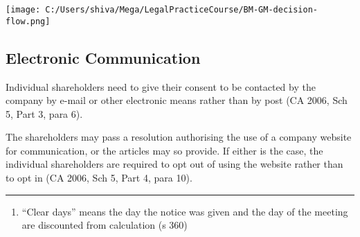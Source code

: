 \documentclass[
]{article}
\providecommand{\tightlist}{%
  \setlength{\itemsep}{0pt}\setlength{\parskip}{0pt}}
\begin{document}
\texttt{[image: C:/Users/shiva/Mega/LegalPracticeCourse/BM-GM-decision-flow.png]}

\hypertarget{electronic-communication}{%
\subsection{Electronic Communication}\label{electronic-communication}}

Individual shareholders need to give their consent to be contacted by
the company by e-mail or other electronic means rather than by post (CA
2006, Sch 5, Part 3, para 6).

The shareholders may pass a resolution authorising the use of a company
website for communication, or the articles may so provide. If either is
the case, the individual shareholders are required to opt out of using
the website rather than to opt in (CA 2006, Sch 5, Part 4, para 10).

\begin{center}\rule{0.5\linewidth}{0.5pt}\end{center}

\begin{enumerate}
\tightlist
\item
  \protect\hypertarget{fn-1-af83d4929e2658fe}{}{``Clear days'' means the
  day the notice was given and the day of the meeting are discounted
  from calculation (s 360)}
\end{enumerate}
\end{document}
